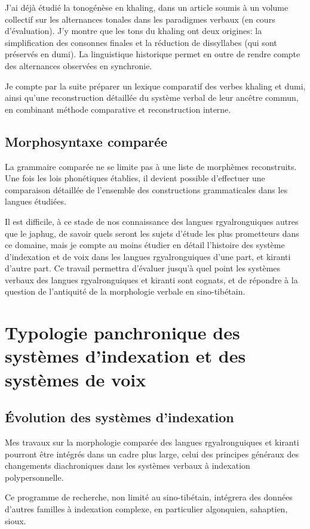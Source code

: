 \documentclass[oldfontcommands,oneside,a4paper,11pt]{article}
\begin{document}
J'ai déjà étudié la tonogénèse en khaling, dans un article soumis à un volume collectif sur les alternances tonales dans les paradigmes verbaux (en cours d'évaluation). J'y montre que les tons du khaling ont deux origines: la simplification des consonnes finales et la réduction de dissyllabes (qui sont préservés en dumi). La linguistique historique permet en outre de rendre compte des alternances observées en synchronie.

Je compte par la suite préparer un lexique comparatif des verbes khaling et dumi, ainsi qu'une reconstruction détaillée du système verbal de leur ancêtre commun, en combinant méthode comparative et reconstruction interne.

\subsection{Morphosyntaxe comparée}
La grammaire comparée ne se limite pas à une liste de morphèmes reconstruits. Une fois les lois phonétiques établies, il devient possible d'effectuer une comparaison détaillée de l'ensemble des constructions grammaticales dans les langues étudiées.

Il est difficile, à ce stade de nos connaissance des langues rgyalronguiques autres que le japhug, de savoir quels seront les sujets d'étude les plus prometteurs dans ce domaine, mais je compte au moins étudier en détail l'histoire des système d'indexation et de voix dans les langues rgyalronguiques d'une part, et kiranti d'autre part. Ce travail permettra d'évaluer jusqu'à quel point les systèmes verbaux des langues rgyalronguiques et kiranti sont cognats, et de répondre à la question de l'antiquité de la morphologie verbale en sino-tibétain.


\section{Typologie panchronique des systèmes d'indexation et des systèmes de voix }
 
\subsection{Évolution des systèmes d'indexation} 
 Mes travaux sur la morphologie comparée des langues rgyalronguiques et kiranti pourront être intégrés dans un cadre plus large, celui des principes généraux des changements diachroniques dans les systèmes verbaux à indexation polypersonnelle.  
 
 Ce programme de recherche, non limité au sino-tibétain, intégrera des données d'autres familles à indexation complexe, en particulier algonquien, sahaptien, sioux. 
\end{document}
